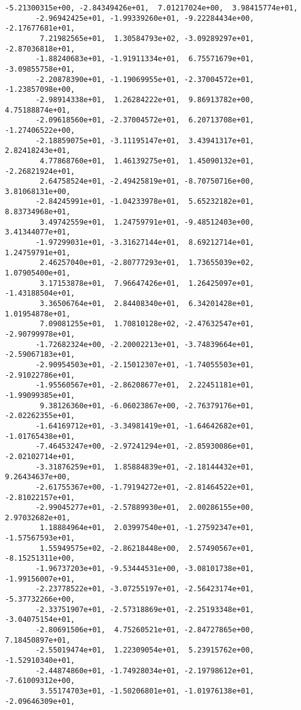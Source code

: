\documentclass[11pt]{article}
\begin{document}
\begin{tcolorbox}[breakable, size=fbox, boxrule=.5pt, pad at break*=1mm, opacityfill=0]
\begin{Verbatim}[commandchars=\\\{\}]
       -5.21300315e+00, -2.84349426e+01,  7.01217024e+00,  3.98415774e+01,
       -2.96942425e+01, -1.99339260e+01, -9.22284434e+00, -2.17677681e+01,
        7.21982565e+01,  1.30584793e+02, -3.09289297e+01, -2.87036818e+01,
       -1.88240683e+01, -1.91911334e+01,  6.75571679e+01, -3.09855758e+01,
       -2.20878390e+01, -1.19069955e+01, -2.37004572e+01, -1.23857098e+00,
       -2.98914338e+01,  1.26284222e+01,  9.86913782e+00,  4.75188874e+01,
       -2.09618560e+01, -2.37004572e+01,  6.20713708e+01, -1.27406522e+00,
       -2.18859075e+01, -3.11195147e+01,  3.43941317e+01,  2.82418243e+01,
        4.77868760e+01,  1.46139275e+01,  1.45090132e+01, -2.26821924e+01,
        2.64758524e+01, -2.49425819e+01, -8.70750716e+00,  3.81068131e+00,
       -2.84245991e+01, -1.04233978e+01,  5.65232182e+01,  8.83734968e+01,
        3.49742559e+01,  1.24759791e+01, -9.48512403e+00,  3.41344077e+01,
       -1.97299031e+01, -3.31627144e+01,  8.69212714e+01,  1.24759791e+01,
        2.46257040e+01, -2.80777293e+01,  1.73655039e+02,  1.07905400e+01,
        3.17153878e+01,  7.96647426e+01,  1.26425097e+01, -1.43188504e+01,
        3.36506764e+01,  2.84408340e+01,  6.34201428e+01,  1.01954878e+01,
        7.09081255e+01,  1.70810128e+02, -2.47632547e+01, -2.90799978e+01,
       -1.72682324e+00, -2.20002213e+01, -3.74839664e+01, -2.59067183e+01,
       -2.90954503e+01, -2.15012307e+01, -1.74055503e+01, -2.91022786e+01,
       -1.95560567e+01, -2.86208677e+01,  2.22451181e+01, -1.99099385e+01,
        9.38126360e+01, -6.06023867e+00, -2.76379176e+01, -2.02262355e+01,
       -1.64169712e+01, -3.34981419e+01, -1.64642682e+01, -1.01765438e+01,
       -7.46453247e+00, -2.97241294e+01, -2.85930086e+01, -2.02102714e+01,
       -3.31876259e+01,  1.85884839e+01, -2.18144432e+01,  9.26434637e+00,
       -2.61755367e+00, -1.79194272e+01, -2.81464522e+01, -2.81022157e+01,
       -2.99045277e+01, -2.57889930e+01,  2.00286155e+00,  2.97032682e+01,
        1.18884964e+01,  2.03997540e+01, -1.27592347e+01, -1.57567593e+01,
        1.55949575e+02, -2.86218448e+00,  2.57490567e+01, -8.15251311e+00,
       -1.96737203e+01, -9.53444531e+00, -3.08101738e+01, -1.99156007e+01,
       -2.23778522e+01, -3.07255197e+01, -2.56423174e+01, -5.37732266e+00,
       -2.33751907e+01, -2.57318869e+01, -2.25193348e+01, -3.04075154e+01,
       -2.80691506e+01,  4.75260521e+01, -2.84727865e+00,  7.18450897e+01,
       -2.55019474e+01,  1.22309054e+01,  5.23915762e+00, -1.52910340e+01,
       -2.44874860e+01, -1.74928034e+01, -2.19798612e+01, -7.61009312e+00,
        3.55174703e+01, -1.50206801e+01, -1.01976138e+01, -2.09646309e+01,

\end{Verbatim}
\end{tcolorbox}
\end{document}

